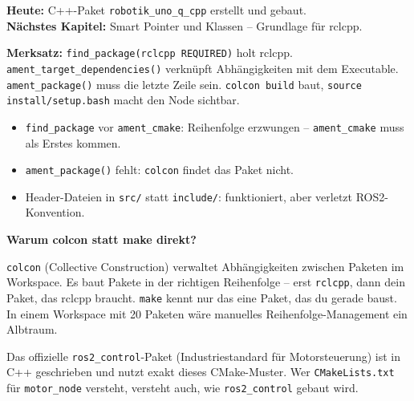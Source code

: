\begin{projektBox}
\textbf{Heute:} C++-Paket \texttt{robotik\_uno\_q\_cpp} erstellt und gebaut.\\
\textbf{Nächstes Kapitel:} Smart Pointer und Klassen -- Grundlage für rclcpp.
\end{projektBox}

\begin{merksatzBox}
\textbf{Merksatz:} \texttt{find\_package(rclcpp REQUIRED)} holt rclcpp.
\texttt{ament\_target\_dependencies()} verknüpft Abhängigkeiten mit dem Executable.
\texttt{ament\_package()} muss die letzte Zeile sein.
\texttt{colcon build} baut, \texttt{source install/setup.bash} macht den Node sichtbar.
\end{merksatzBox}

\begin{fehlerBox}
\begin{itemize}
\item \texttt{find\_package} vor \texttt{ament\_cmake}: Reihenfolge erzwungen --
  \texttt{ament\_cmake} muss als Erstes kommen.
\item \texttt{ament\_package()} fehlt: \texttt{colcon} findet das Paket nicht.
\item Header-Dateien in \texttt{src/} statt \texttt{include/}: funktioniert,
  aber verletzt ROS2-Konvention.
\end{itemize}
\end{fehlerBox}

\begin{haubeBox}
\textbf{Warum colcon statt make direkt?}

\texttt{colcon} (Collective Construction) verwaltet
Abhängigkeiten zwischen Paketen im Workspace.
Es baut Pakete in der richtigen Reihenfolge --
erst \texttt{rclcpp}, dann dein Paket, das rclcpp braucht.
\texttt{make} kennt nur das eine Paket, das du gerade baust.
In einem Workspace mit 20 Paketen wäre manuelles Reihenfolge-Management
ein Albtraum.
\end{haubeBox}

\begin{robotikBox}
Das offizielle \texttt{ros2\_control}-Paket
(Industriestandard für Motorsteuerung) ist in C++ geschrieben
und nutzt exakt dieses CMake-Muster.
Wer \texttt{CMakeLists.txt} für \texttt{motor\_node} versteht,
versteht auch, wie \texttt{ros2\_control} gebaut wird.
\end{robotikBox}


